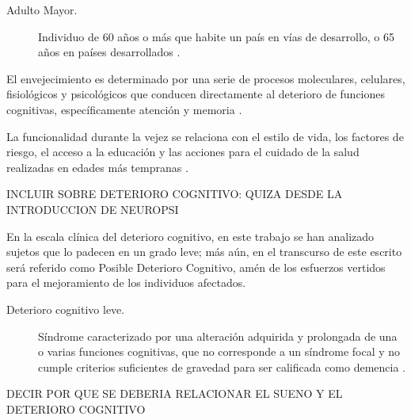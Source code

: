 \begin{description}
\item[Adulto Mayor.] Individuo de 60 a\~nos o m\'as que habite un pa\'is en v\'ias de desarrollo, o 
65 a\~nos en pa\'ises desarrollados \cite{Hita14}.
\end{description}

El envejecimiento es determinado por una serie de procesos moleculares, celulares, fisiol\'ogicos y 
psicol\'ogicos que conducen directamente al deterioro de funciones cognitivas, espec\'ificamente 
atenci\'on y memoria \cite{Navarrete03,Park09}. 

La funcionalidad durante la vejez se relaciona con el estilo de vida, los factores de riesgo, el 
acceso a la educaci\'on y las acciones para el cuidado de la salud realizadas en edades m\'as 
tempranas \cite{Ohayon04,Sanhueza14}.

INCLUIR SOBRE DETERIORO COGNITIVO: QUIZA DESDE LA INTRODUCCION DE NEUROPSI

En la escala cl\'inica del deterioro cognitivo, en este trabajo se han analizado sujetos que lo
padecen en un grado leve; m\'as a\'un, en el transcurso de este escrito ser\'a referido como 
Posible Deterioro Cognitivo, am\'en de los esfuerzos vertidos para el mejoramiento de los 
individuos afectados.

\begin{description}
\item[Deterioro cognitivo leve.] S\'indrome caracterizado por una alteraci\'on adquirida y 
prolongada de una o varias funciones cognitivas, que no corresponde a un s\'indrome focal y no 
cumple criterios suficientes de gravedad para ser calificada como demencia \cite{Robles02}.
\end{description}

DECIR POR QUE SE DEBERIA RELACIONAR EL SUENO Y EL DETERIORO COGNITIVO

